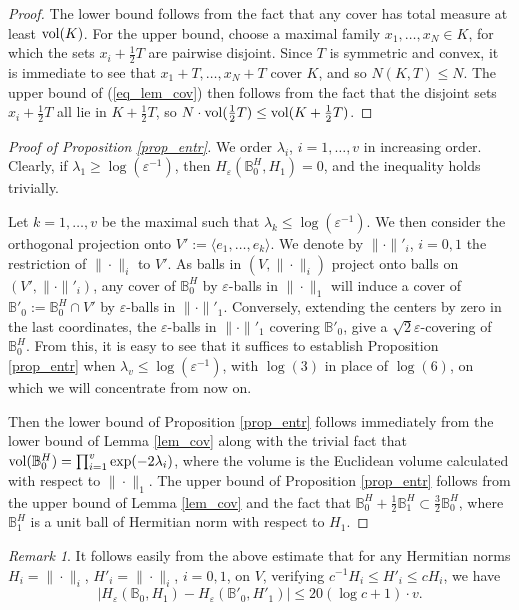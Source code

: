 \documentclass[12pt]{article}
\numberwithin{equation}{section}
\theoremstyle{theorem}
\theoremstyle{definition}
\theoremstyle{remark}
\newtheorem{rem}[thm]{Remark}
\begin{document}
	\begin{proof}
		The lower bound follows from the fact that any cover has total measure at least ${\rm{vol}}(K)$. 
		For the upper bound, choose a maximal family $x_1, \ldots, x_N \in K$, for which the sets $x_i +  \frac{1}{2} T$ are pairwise disjoint. 
		Since $T$ is symmetric and convex, it is immediate to see that $x_1 + T, \ldots, x_N + T$ cover $K$, and so $N(K, T) \leq N$. 
		The upper bound of (\ref{eq_lem_cov}) then follows from the fact that the disjoint sets $x_i + \frac{1}{2} T$ all lie in $K + \frac{1}{2} T$, so $N \cdot {\rm{vol}}(\frac{1}{2} T) \leq {\rm{vol}}(K + \frac{1}{2} T)$.
	\end{proof}
	\begin{proof}[Proof of Proposition \ref{prop_entr}]
		We order $\lambda_i$, $i = 1, \ldots, v$ in increasing order.
		Clearly, if $\lambda_1 \geq \log (\varepsilon^{-1})$, then $H_{\varepsilon}(\mathbb{B}^H_0, H_1) = 0$, and the inequality holds trivially.
		\par 
		Let $k = 1, \ldots, v$ be the maximal such that $\lambda_k \leq \log (\varepsilon^{-1})$.
		We then consider the orthogonal projection onto $V' := \langle e_1, \ldots, e_k \rangle$.
		We denote by $\| \cdot \|'_i$, $i = 0, 1$ the restriction of $\| \cdot \|_i$ to $V'$.
		As balls in $(V, \| \cdot \|_i)$ project onto balls on $(V', \| \cdot \|'_i)$, any cover of $\mathbb{B}^H_0$ by $\varepsilon$-balls in $\| \cdot \|_1$ will induce a cover of $\mathbb{B}'_0 := \mathbb{B}^H_0 \cap V'$ by $\varepsilon$-balls in $\| \cdot \|'_1$.
		Conversely, extending the centers by zero in the last coordinates, the $\varepsilon$-balls in $\| \cdot \|'_1$ covering $\mathbb{B}'_0$, give a $\sqrt{2} \varepsilon$-covering of $\mathbb{B}^H_0$.
		From this, it is easy to see that it suffices to establish Proposition \ref{prop_entr} when $\lambda_v \leq \log (\varepsilon^{-1})$, with $\log(3)$ in place of $\log(6)$, on which we will concentrate from now on.
		\par 
		Then the lower bound of Proposition \ref{prop_entr} follows immediately from the lower bound of Lemma \ref{lem_cov} along with the trivial fact that ${\rm{vol}}(\mathbb{B}^H_0) = \prod_{i = 1}^{v} \exp(-2 \lambda_i)$, where the volume is the Euclidean volume calculated with respect to $\| \cdot \|_1$.
		The upper bound of Proposition \ref{prop_entr} follows from the upper bound of Lemma \ref{lem_cov} and the fact that $\mathbb{B}^H_0 + \frac{1}{2} \mathbb{B}^H_1 \subset \frac{3}{2} \mathbb{B}^H_0$, where $\mathbb{B}^H_1$ is a unit ball of Hermitian norm with respect to $H_1$.
	\end{proof}
	\begin{rem}\label{rem_entr_change}
		It follows easily from the above estimate that for any Hermitian norms $H_i = \| \cdot \|_i$, $H'_i = \| \cdot \|_i$, $i = 0, 1$, on $V$, verifying $c^{-1} H_i \leq H'_i \leq c H_i$, we have 
		\begin{equation}
			\big|
				H_{\varepsilon}(\mathbb{B}_0, H_1)
				-
				H_{\varepsilon}(\mathbb{B}'_0, H'_1)
			\Big|
			\leq
			20 (\log c + 1) \cdot v.
		\end{equation}
	\end{rem}
	
\end{document}
